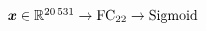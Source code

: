 $\vect{x} \in \real^{\num{20531}}
	\newline \rightarrow \text{FC}_{22}
	\newline \rightarrow \text{Sigmoid}$